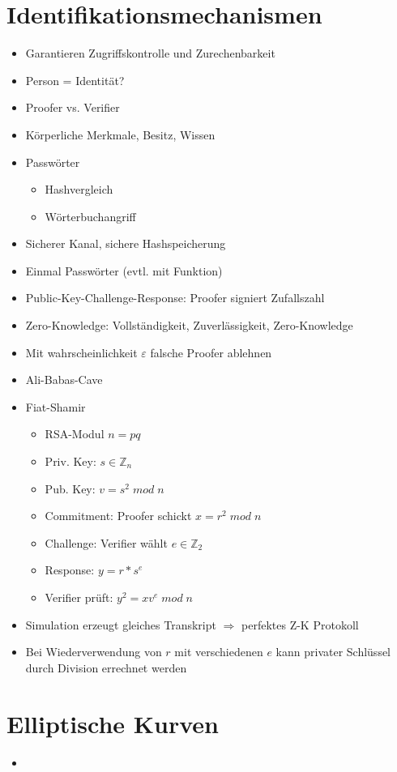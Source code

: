 \documentclass[11pt, paper=a4, twocolumn]{scrartcl}
\newcommand*{\Z}{\mathbb{Z}}
\begin{document}
	\section{Identifikationsmechanismen}
		\begin{itemize}
			\item Garantieren Zugriffskontrolle und Zurechenbarkeit
			\item Person = Identität?
			\item Proofer vs. Verifier
			\item Körperliche Merkmale, Besitz, Wissen
			\item Passwörter
				\begin{itemize}
					\item Hashvergleich
					\item Wörterbuchangriff
				\end{itemize}
			\item Sicherer Kanal, sichere Hashspeicherung
			\item Einmal Passwörter (evtl. mit Funktion)
			\item Public-Key-Challenge-Response: Proofer signiert Zufallszahl
			\item Zero-Knowledge: Vollständigkeit, Zuverlässigkeit, Zero-Knowledge
			\item Mit wahrscheinlichkeit $\varepsilon$ falsche Proofer ablehnen
			\item Ali-Babas-Cave
			\item Fiat-Shamir
				\begin{itemize}
					\item RSA-Modul $n=pq$
					\item Priv. Key: $s\in\Z_n$
					\item Pub. Key: $v=s^2\;mod\;n$
					\item Commitment: Proofer schickt $x=r^2\;mod\;n$
					\item Challenge: Verifier wählt $e\in\Z_2$
					\item Response: $y=r*s^e$
					\item Verifier prüft: $y^2=xv^e\;mod\;n$
				\end{itemize} 
			\item Simulation erzeugt gleiches Transkript $\Rightarrow$ perfektes Z-K Protokoll
			\item Bei Wiederverwendung von $r$ mit verschiedenen $e$ kann privater Schlüssel durch Division errechnet werden
		\end{itemize}
	
	\section{Elliptische Kurven}
		\begin{itemize}
			\item 
		\end{itemize}
\end{document}
